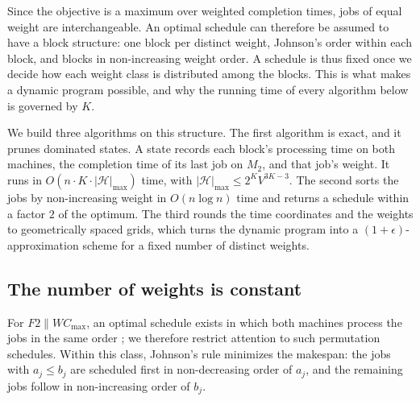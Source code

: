 \documentclass[12pt]{article}
\let\origsubsection\subsection
\renewcommand{\subsection}{\FloatBarrier\origsubsection}
\begin{document}
\begin{sloppypar}
Since the objective is a maximum over weighted completion times, jobs of equal weight are
interchangeable. An optimal schedule can therefore be assumed to have a block structure:
one block per distinct weight, Johnson's order within each block, and blocks in
non-increasing weight order. A schedule is thus fixed once we decide how each weight class
is distributed among the blocks. This is what makes a dynamic program possible, and why
the running time of every algorithm below is governed by $K$.

We build three algorithms on this structure. The first algorithm is exact, and it prunes
dominated states. A state records each block's processing time on both machines, the
completion time of its last job on $M_2$, and that job's weight. It runs in
$O(n \cdot K \cdot |\mathscr{H}|_{\max})$ time, with
$|\mathscr{H}|_{\max} \le 2^{K}V^{3K-3}$. The second sorts the jobs by non-increasing
weight in $O(n\log n)$ time and returns a schedule within a factor $2$ of the optimum. The
third rounds the time coordinates and the weights to geometrically spaced grids, which
turns the dynamic program into a $(1+\epsilon)$-approximation scheme for a fixed number of
distinct weights.

\subsection{The number of weights is constant}
For $F2 \parallel W C_{\max}$, an optimal schedule exists in which both machines process the jobs
in the same order \citep{baker1974introduction}; we therefore restrict attention to such
permutation schedules. Within this class, Johnson's rule \citep{johnson1954optimal} minimizes
the makespan: the jobs with $a_j \le b_j$ are scheduled first in non-decreasing order of $a_j$,
and the remaining jobs follow in non-increasing order of $b_j$.


\end{sloppypar}
\end{document}
